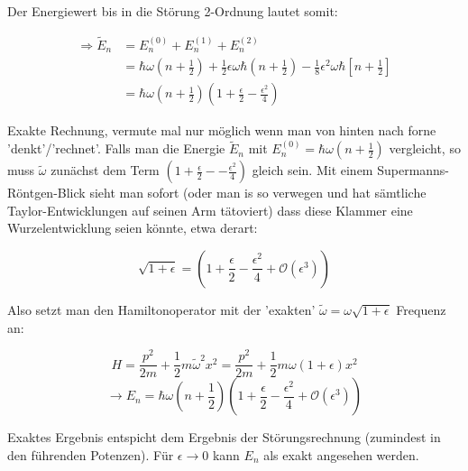 Der Energiewert bis in die Störung 2-Ordnung lautet somit:

\begin{align}
\Rightarrow \tilde E_n &= E^{(0)}_n+E^{(1)}_n+E^{(2)}_n\\
&= \hbar \omega(n+\frac{1}{2}) + \frac{1}{2}\epsilon \omega\hbar (n + \frac{1}{2})- \frac{1}{8}\epsilon^2 \omega\hbar [n+\frac{1}{2}]\\
&=\hbar \omega(n+\frac{1}{2})(1+\frac{\epsilon}{2}-\frac{\epsilon^2}{4})
\end{align}

Exakte Rechnung, vermute mal nur möglich wenn man von hinten nach forne 'denkt'/'rechnet'. Falls man die Energie \(\tilde E_n\) mit \(E^{(0)}_n = \hbar\omega(n+\frac{1}{2})\) vergleicht, so muss \(\tilde \omega\) zunächst dem Term \((1+\frac{\epsilon}{2}--\frac{\epsilon^2}{4})\) gleich sein. Mit einem Supermanns-Röntgen-Blick sieht man sofort (oder man is so verwegen und hat sämtliche Taylor-Entwicklungen auf seinen Arm tätoviert) dass diese Klammer eine Wurzelentwicklung seien könnte, etwa derart:

\[ \sqrt{1+\epsilon} = (1+\frac{\epsilon}{2}-\frac{\epsilon^2}{4}+\mathcal O(\epsilon^3)) \]

Also setzt man den Hamiltonoperator mit der 'exakten' \(\tilde\omega=\omega\sqrt{1+\epsilon}\) Frequenz an:

\[ H = \frac{p^2}{2m}+\frac{1}{2}m\tilde\omega^2x^2=\frac{p^2}{2m}+\frac{1}{2}m\omega(1+\epsilon)x^2 \]
\[\rightarrow E_n = \hbar \omega(n+\frac{1}{2})(1+\frac{\epsilon}{2}-\frac{\epsilon^2}{4} +\mathcal O(\epsilon^3) )\]

Exaktes Ergebnis entspicht dem Ergebnis der Störungsrechnung (zumindest in den führenden Potenzen). Für \(\epsilon \rightarrow 0\) kann \(E_n\) als exakt angesehen werden.








